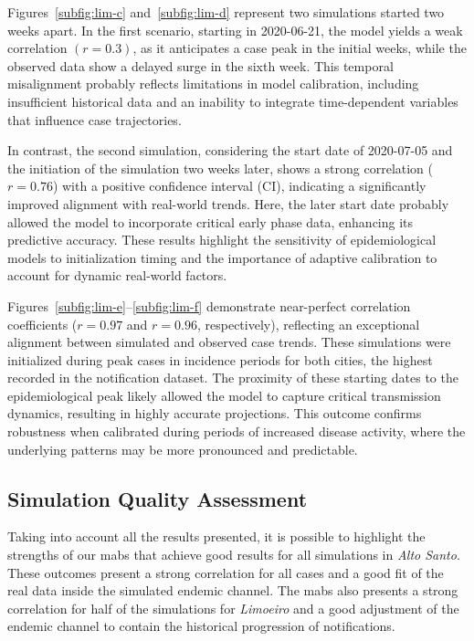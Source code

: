 Figures~\ref{subfig:lim-c} and~\ref{subfig:lim-d} represent two simulations
started two weeks apart. In the first scenario, starting in 2020-06-21, the
model yields a weak correlation $(r = 0.3)$, as it anticipates a case peak in
the initial weeks, while the observed data show a delayed surge in the sixth
week. This temporal misalignment probably reflects limitations in model
calibration, including insufficient historical data and an inability to
integrate time-dependent variables that influence case trajectories.

In contrast, the second simulation, considering the start date of 2020-07-05 and
the initiation of the simulation two weeks later, shows a strong correlation ($r
	= 0.76$) with a positive confidence interval (CI), indicating a significantly
improved alignment with real-world trends. Here, the later start date probably
allowed the model to incorporate critical early phase data, enhancing its
predictive accuracy. These results highlight the sensitivity of epidemiological
models to initialization timing and the importance of adaptive calibration to
account for dynamic real-world factors.

Figures~\ref{subfig:lim-e}--\ref{subfig:lim-f}  demonstrate near-perfect
correlation coefficients ($r = 0.97$ and $r = 0.96$, respectively), reflecting
an exceptional alignment between simulated and observed case trends. These
simulations were initialized during peak cases in incidence periods for both
cities, the highest recorded in the notification dataset. The proximity of these
starting dates to the epidemiological peak likely allowed the model to capture
critical transmission dynamics, resulting in highly accurate projections. This
outcome confirms robustness when calibrated during periods of increased disease
activity, where the underlying patterns may be more pronounced and predictable.


\subsection{Simulation Quality Assessment}

Taking into account all the results presented, it is possible to highlight the
strengths of our \gls{mabs} that achieve good results for all simulations in
\textit{Alto Santo}. These outcomes present a strong correlation for all cases
and a good fit of the real data inside the simulated endemic channel. The
\gls{mabs} also presents a strong correlation for half of the simulations for
\textit{Limoeiro} and a good adjustment of the endemic channel to contain the
historical progression of notifications.


